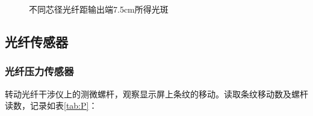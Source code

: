 \documentclass[10pt,a4paper,twoside,UTF8]{ctexart}
\begin{document}
\begin{figure}[H]
	\centering
	\caption{不同芯径光纤距输出端7.5cm所得光斑}
	\label{fig:sp}
\end{figure}


\subsection{光纤传感器}
\subsubsection{光纤压力传感器}

转动光纤干涉仪上的测微螺杆，观察显示屏上条纹的移动。读取条纹移动数及螺杆读数，记录如表\ref{tab:P}：
\end{document}
